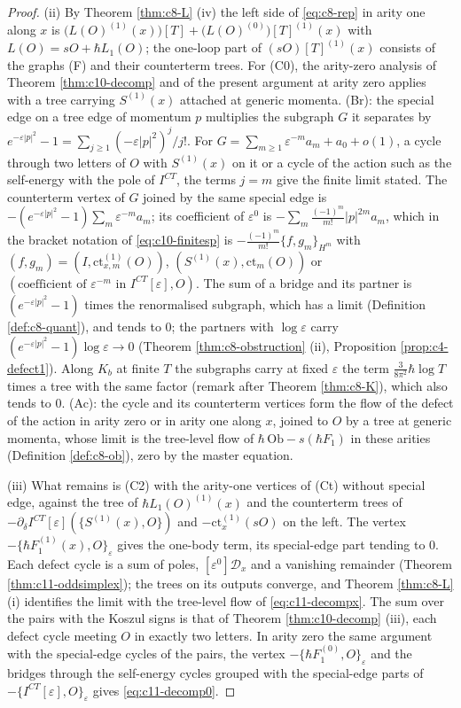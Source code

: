 \begin{proof}
(ii) By Theorem \ref{thm:c8-L} (iv) the left side of \eqref{eq:c8-rep} in arity one along $x$ is $\big(L(O)^{(1)}(x)\big)[T]+\big(L(O)^{(0)}\big)[T]^{(1)}(x)$ with $L(O)=sO+\hbar L_1(O)$; the one-loop part of $(sO)[T]^{(1)}(x)$ consists of the graphs (F) and their counterterm trees. For (C0), the arity-zero analysis of Theorem \ref{thm:c10-decomp} and of the present argument at arity zero applies with a tree carrying $S^{(1)}(x)$ attached at generic momenta. (Br): the special edge on a tree edge of momentum $p$ multiplies the subgraph $G$ it separates by $e^{-\varepsilon|p|^2}-1=\sum_{j\ge1}(-\varepsilon|p|^2)^j/j!$. For $G=\sum_{m\ge1}\varepsilon^{-m}a_m+a_0+o(1)$, a cycle through two letters of $O$ with $S^{(1)}(x)$ on it or a cycle of the action such as the self-energy with the pole of $I^{CT}$, the terms $j=m$ give the finite limit stated. The counterterm vertex of $G$ joined by the same special edge is $-(e^{-\varepsilon|p|^2}-1)\sum_m\varepsilon^{-m}a_m$; its coefficient of $\varepsilon^0$ is $-\sum_m\frac{(-1)^m}{m!}|p|^{2m}a_m$, which in the bracket notation of \eqref{eq:c10-finitesp} is $-\frac{(-1)^m}{m!}\{f,g_m\}_{H^m}$ with $(f,g_m)=(I,\mathrm{ct}^{(1)}_{x,m}(O))$, $(S^{(1)}(x),\mathrm{ct}_m(O))$ or $(\text{coefficient of }\varepsilon^{-m}\text{ in }I^{CT}[\varepsilon],O)$. The sum of a bridge and its partner is $(e^{-\varepsilon|p|^2}-1)$ times the renormalised subgraph, which has a limit (Definition \ref{def:c8-quant}), and tends to $0$; the partners with $\log\varepsilon$ carry $(e^{-\varepsilon|p|^2}-1)\log\varepsilon\to0$ (Theorem \ref{thm:c8-obstruction} (ii), Proposition \ref{prop:c4-defect1}). Along $K_b$ at finite $T$ the subgraphs carry at fixed $\varepsilon$ the term $\tfrac3{8\pi^2}\hbar\log T$ times a tree with the same factor (remark after Theorem \ref{thm:c8-K}), which also tends to $0$. (Ac): the cycle and its counterterm vertices form the flow of the defect of the action in arity zero or in arity one along $x$, joined to $O$ by a tree at generic momenta, whose limit is the tree-level flow of $\hbar\,\mathrm{Ob}-s(\hbar F_1)$ in these arities (Definition \ref{def:c8-ob}), zero by the master equation.

(iii) What remains is (C2) with the arity-one vertices of (Ct) without special edge, against the tree of $\hbar L_1(O)^{(1)}(x)$ and the counterterm trees of $-\partial_\delta I^{CT}[\varepsilon](\{S^{(1)}(x),O\})$ and $-\mathrm{ct}^{(1)}_x(sO)$ on the left. The vertex $-\{\hbar F_1^{(1)}(x),O\}_\varepsilon$ gives the one-body term, its special-edge part tending to $0$. Each defect cycle is a sum of poles, $[\varepsilon^0]\mathcal D_x$ and a vanishing remainder (Theorem \ref{thm:c11-oddsimplex}); the trees on its outputs converge, and Theorem \ref{thm:c8-L} (i) identifies the limit with the tree-level flow of \eqref{eq:c11-decompx}. The sum over the pairs with the Koszul signs is that of Theorem \ref{thm:c10-decomp} (iii), each defect cycle meeting $O$ in exactly two letters. In arity zero the same argument with the special-edge cycles of the pairs, the vertex $-\{\hbar F_1^{(0)},O\}_\varepsilon$ and the bridges through the self-energy cycles grouped with the special-edge parts of $-\{I^{CT}[\varepsilon],O\}_\varepsilon$ gives \eqref{eq:c11-decomp0}.


\end{proof}
